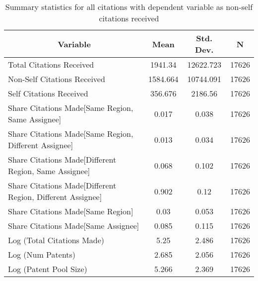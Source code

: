
\begin{table}[htbp]\centering \caption{Summary statistics for all citations with dependent variable as non-self citations received \label{a.e.o.t.n.nsummary}}
\begin{tabular}{l c c  c}\hline\hline
\multicolumn{1}{c}{\textbf{Variable}} & \textbf{Mean}
 & \textbf{Std. Dev.} & \textbf{N}\\ \hline
Total Citations Received & 1941.34 & 12622.723  & 17626\\
Non-Self Citations Received & 1584.664 & 10744.091  & 17626\\
Self Citations Received & 356.676 & 2186.56  & 17626\\
Share Citations Made[Same Region, Same Assignee] & 0.017 & 0.038  & 17626\\
Share Citations Made[Same Region, Different Assignee] & 0.013 & 0.034  & 17626\\
Share Citations Made[Different Region, Same Assignee] & 0.068 & 0.102  & 17626\\
Share Citations Made[Different Region, Different Assignee] & 0.902 & 0.12  & 17626\\
Share Citations Made[Same Region] & 0.03 & 0.053  & 17626\\
Share Citations Made[Same Assignee] & 0.085 & 0.115  & 17626\\
Log (Total Citations Made) & 5.25 & 2.486  & 17626\\
Log (Num Patents) & 2.685 & 2.056  & 17626\\
Log (Patent Pool Size) & 5.266 & 2.369  & 17626\\
\hline\end{tabular}
\end{table}
